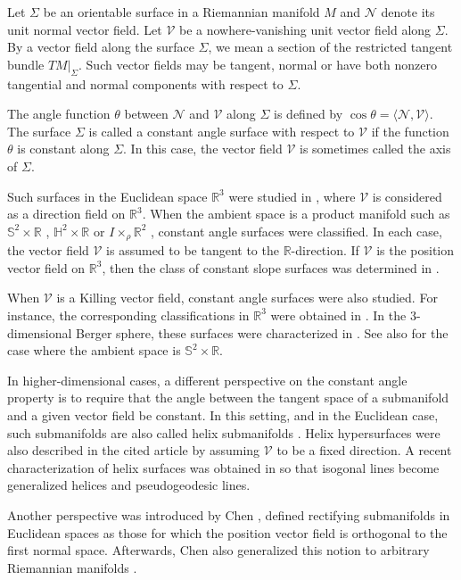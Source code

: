 \documentclass[12pt,reqno]{amsart}
\def\r{\mathbb R}
\def\s{\mathbb S}
\def\h{\mathbb H}
\def\v{\mathcal V}
\def\n{\mathcal N}
\theoremstyle{definition}
\begin{document}
Let $\Sigma$ be an orientable surface in a Riemannian manifold $M$ and $\n$ denote its unit normal vector field. Let $\v$ be a nowhere-vanishing unit vector field along $\Sigma$. By a vector field along the surface $\Sigma$, we mean a section of the restricted tangent bundle $TM|_{\Sigma}$. Such vector fields may be tangent, normal or have both nonzero tangential and normal components with respect to $\Sigma$. 

The angle function $\theta$ between $\n$ and $\v$ along $\Sigma$ is defined by $\cos\theta=\langle \n,\v\rangle$. The surface $\Sigma$ is called a constant angle surface with respect to $\v$ if the function $\theta$ is constant along $\Sigma$. In this case, the vector field $\v$ is sometimes called the axis of $\Sigma$.

Such surfaces in the Euclidean space $\r^3$ were studied in \cite{cd}, where $\v$ is considered as a direction field on $\r^3$. When the ambient space is a product manifold such as $\s^2\times \r$ \cite{dfvv}, $\h^2\times \r$ \cite{dm} or $I\times_\rho \r^2$ \cite{dmvv}, constant angle surfaces were classified. In each case, the vector field $\v$ is assumed to be tangent to the $\r$-direction. If $\v$ is the position vector field on $\r^3$, then the class of constant slope surfaces was determined in \cite{mun}. 

When $\v$ is a Killing vector field, constant angle surfaces were also studied. For instance, the corresponding classifications in $\r^3$ were obtained in \cite{mun1}. In the $3$-dimensional Berger sphere, these surfaces were characterized in \cite{mo}. See also \cite{mun2} for the case where the ambient space is $\s^2\times \r$.

In higher-dimensional cases, a different perspective on the constant angle property is to require that the angle between the tangent space of a submanifold and a given vector field be constant. In this setting, and in the Euclidean case, such submanifolds are also called helix submanifolds \cite{dsr}. Helix hypersurfaces were also described in the cited article by assuming $\v$ to be a fixed direction. A recent characterization of helix surfaces was obtained in \cite{loy6} so that isogonal lines become generalized helices and pseudogeodesic lines.

Another perspective was introduced by Chen \cite{crs0}, defined rectifying submanifolds in Euclidean spaces as those for which the position vector field is orthogonal to the first normal space. Afterwards, Chen also generalized this notion to arbitrary Riemannian manifolds \cite{crs3}.
\end{document}
